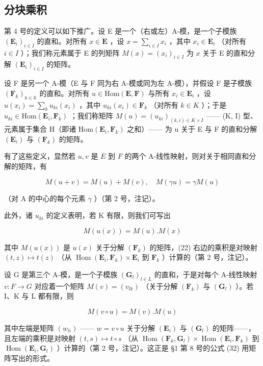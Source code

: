 \subsection{分块乘积}

第 4 号的定义可以如下推广。设 E 是一个（右或左）A-模，是一个子模族 \((\mathbf{E}_i)_{i\in I}\) 的直和。对所有 \(x\in \mathbf{E}\) ，设 \(x = \sum_{i\in I}x_i\) ，其中 \(x_{i}\in \mathbf{E}_{i}\) （对所有 \(i\in I\) ）；我们称元素属于 E 的列矩阵 \(M(x) = (x_{i})_{i\in I}\) 为 \(x\) 关于 E 的直和分解 \((\mathbf{E}_i)_{i\in I}\) 的矩阵。

设 F 是另一个 A-模（E 与 F 同为右 A-模或同为左 A-模），并假设 F 是子模族 \((\mathbf{F}_{k})_{k\in\mathbb{K}}\) 的直和。对所有 \(u\in\mathrm{Hom}(\mathbf{E},\mathbf{F})\) 与所有 \(x_{i}\in\mathbf{E}_{i}\) ，设 \(u(x_{i})=\sum_{k}u_{ki}(x_{i})\) ，其中 \(u_{ki}(x_{i})\in\mathbf{F}_{k}\) （对所有 \(k\in K\) ）；于是 \(u_{ki}\in\mathrm{Hom}(\mathbf{E}_{i},\mathbf{F}_{k})\) ；我们称矩阵 \(M(u)=(u_{ki})_{(k,i)\in K\times I}\) —— (K, I) 型、元素属于集合 H（即诸 \(\mathrm{Hom}(\mathbf{E}_{i},\mathbf{F}_{k})\) 之和）—— 为 u 关于 E 与 F 的直和分解 \((\mathbf{E}_{i})\) 与 \((\mathbf{F}_{k})\) 的矩阵。

有了这些定义，显然若 \(u, v\) 是 \(E\) 到 \(F\) 的两个 A-线性映射，则对关于相同直和分解的矩阵，有

\[
M (u + v) = M (u) + M (v), \quad M (\gamma u) = \gamma M (u)\tag{21}
\]

（对 A 的中心的每个元素 \(\gamma\) ）（第 2 号，注记）。

此外，诸 \(u_{ki}\) 的定义表明，若 K 有限，则我们可写出

\[
M (u (x)) = M (u). M (x)\tag{22}
\]

其中 \(M(u(x))\) 是 \(u(x)\) 关于分解 \((\mathbf{F}_k)\) 的矩阵，(22) 右边的乘积是对映射 \((t, z) \mapsto t(z)\) （从 \(\operatorname{Hom}(\mathbf{E}_i, \mathbf{F}_k) \times \mathbf{E}_i\) 到 \(\mathbf{F}_k\) ）计算的（第 2 号，注记）。

设 G 是第三个 A-模，是一个子模族 \((\mathbf{G}_{l})_{l\in L}\) 的直和，于是对每个 A-线性映射 \(v:F\to G\) 对应着一个矩阵 \(M(v)=(v_{lk})\) （关于分解 \((\mathbf{F}_{k})\) 与 \((\mathbf{G}_{l})\) ）。若 I、K 与 L 都有限，则

\[
M (v \circ u) = M (v). M (u)\tag{23}
\]

其中左端是矩阵 \((w_{li})\) —— \(w = v \circ u\) 关于分解 \((\mathbf{E}_i)\) 与 \((\mathbf{G}_l)\) 的矩阵——，且左端的乘积是对映射 \((t, s) \mapsto t \circ s\) （从 \(\operatorname{Hom}(\mathbf{F}_k, \mathbf{G}_l) \times \operatorname{Hom}(\mathbf{E}_i, \mathbf{F}_k)\) 到 \(\operatorname{Hom}(\mathbf{E}_i, \mathbf{G}_l)\) ）计算的（第 2 号，注记）。这正是 §1 第 8 号的公式 (32) 用矩阵写出的形式。

